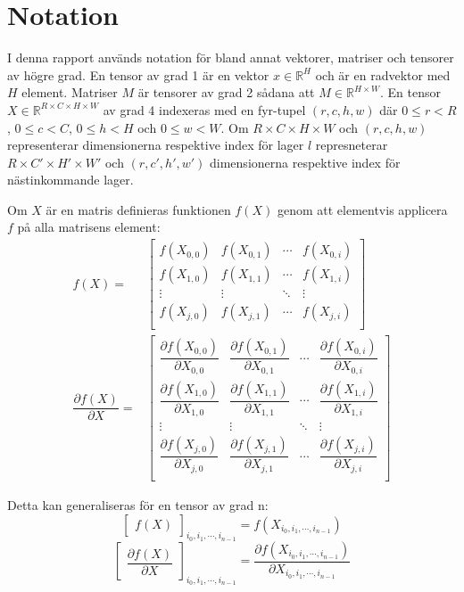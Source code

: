 \documentclass[a4paper,11pt,twoside]{article}
\newcommand*{\pd}[2]{\ensuremath{\dfrac{\partial #1}{\partial #2}}}
\begin{document}
\section{Notation}
I denna rapport används notation för bland annat vektorer, matriser och tensorer av högre grad. En tensor av grad 1 är en vektor $x \in \mathbb{R}^H$ och är en radvektor med $H$ element. Matriser $M$ är tensorer av grad 2 sådana att $M \in \mathbb{R}^{H \times W}$. En tensor $X \in \mathbb{R}^{R \times C \times H \times W}$ av grad 4 indexeras med en fyr-tupel $(r,c,h,w)$ där $0 \leq r < R$, $0 \leq c < C$, $0 \leq h < H$ och $0 \leq w < W$. Om $R \times C \times H \times W$ och $(r,c,h,w)$ representerar dimensionerna respektive index för lager $l$ represneterar $R \times C' \times H' \times W'$ och $(r,c',h',w')$ dimensionerna respektive index för nästinkommande lager.

Om $X$ är en matris definieras funktionen $f(X)$ genom att elementvis applicera $f$ på alla matrisens element:
\begin{align}
	f(X) = 
	& \begin{bmatrix}
	f(X_{0,0}) & f(X_{0,1}) & \cdots & f(X_{0,i}) \\
	f(X_{1,0}) & f(X_{1,1}) & \cdots & f(X_{1,i}) \\
	\vdots     & \vdots     & \ddots & \vdots     \\
	f(X_{j,0}) & f(X_{j,1}) & \cdots & f(X_{j,i}) \\
	\end{bmatrix} \\
\pd{f(X)}{X} = 
	& \begin{bmatrix}
	\pd{f(X_{0,0})}{X_{0,0}} & \pd{f(X_{0,1})}{X_{0,1}} & \cdots & \pd{f(X_{0,i})}{X_{0,i}} \\
	\pd{f(X_{1,0})}{X_{1,0}} & \pd{f(X_{1,1})}{X_{1,1}} & \cdots & \pd{f(X_{1,i})}{X_{1,i}} \\
	\vdots                   & \vdots                   & \ddots & \vdots     \\
	\pd{f(X_{j,0})}{X_{j,0}} & \pd{f(X_{j,1})}{X_{j,1}} & \cdots & \pd{f(X_{j,i})}{X_{j,i}} \\
	\end{bmatrix}
\end{align}

Detta kan generaliseras för en tensor av grad n:
\begin{equation}\label{f(x)}
	\begin{bmatrix} f(X) \end{bmatrix}_{i_0, i_1, \cdots, i_{n-1}}
	= f(X_{i_0, i_1, \cdots, i_{n-1}})
\end{equation}
\begin{equation}\label{f'(x)}
	\begin{bmatrix}
	\pd{f(X)}{X}
	\end{bmatrix}_{i_0, i_1, \cdots, i_{n-1}}
	=
	\pd{f(X_{i_0, i_1, \cdots, i_{n-1}})}{X_{i_0, i_1, \cdots, i_{n-1}}}
\end{equation}
\end{document}
